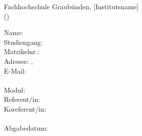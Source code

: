 \begin{titlepage}
    
    \begin{center}
        Fachhochschule Graubünden, [Institutsname]
        \vfill
        \huge{\haupttitel}\\
        \large{(\untertitel)}
    \end{center}
    
    \vfill
    
    \begin{tabbing}
    Name: \autorenschaft\\
    Studiengang: \studiengang\\
    Matrikelnr.: \matrikelnummer\\
    Adresse: \adresse, \plz~\ort\\
    E-Mail: \email\\
    \\
    Modul: \modul\\
    Referent/in: \\
    Koreferent/in: \coRefe\\
    \\
    Abgabedatum: \abgabedatum
    \end{tabbing}
    
    \vfill
    

\end{titlepage}
